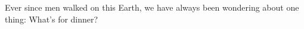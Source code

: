 
Ever since men walked on this Earth, we have always been wondering about one thing: What's for dinner? \parencite{coe:2008, he:2018, korobko:2008}